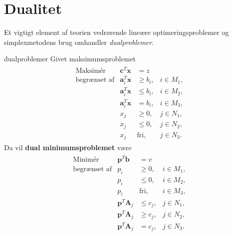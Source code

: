 \section{Dualitet}
%
Et vigtigt element af teorien vedrørende lineære optimeringsproblemer og simplexmetodens brug omhandler \textit{dualproblemer}.
%
\begin{defn}{}{dualproblemer}
Givet maksimumsproblemet
%
\begin{align*}
\begin{array}{lrll}
\text{Maksimér}		&\textbf{c}^T\textbf{x}	&=z			&\\
\text{begrænset af}	&\textbf{a}_i^T\textbf{x}	&\geq b_i,	&i \in M_1,\\
					&\textbf{a}_i^T\textbf{x}	&\leq b_i,	&i \in M_2,\\
					&\textbf{a}_i^T\textbf{x}	& = b_i,	&i \in M_3,\\
					&x_j					&\geq 0,	&j \in N_1,\\
					&x_j					&\leq 0,	&j \in N_2,\\							&x_j					&\text{fri},	&j \in N_3.
\end{array}
\end{align*}
%
Da vil \textbf{dual minimumsproblemet} være
%
\begin{align*}
\begin{array}{lrll}
\text{Minimér}		&\textbf{p}^T\textbf{b}	&=v			&\\
\text{begrænset af}	&p_i					&\geq 0,	&i \in M_1,\\
					&p_i					&\leq 0,	&i \in M_2,\\
					&p_i					&\text{fri},	&i \in M_3,\\
					&\textbf{p}^T\textbf{A}_j	&\leq c_j,	&j \in N_1,\\
					&\textbf{p}^T\textbf{A}_j	&\geq c_j,	&j \in N_2,\\
					&\textbf{p}^T\textbf{A}_j	& = c_j,	&j \in N_3.
\end{array}
\end{align*}
%
\end{defn}
\noindent

